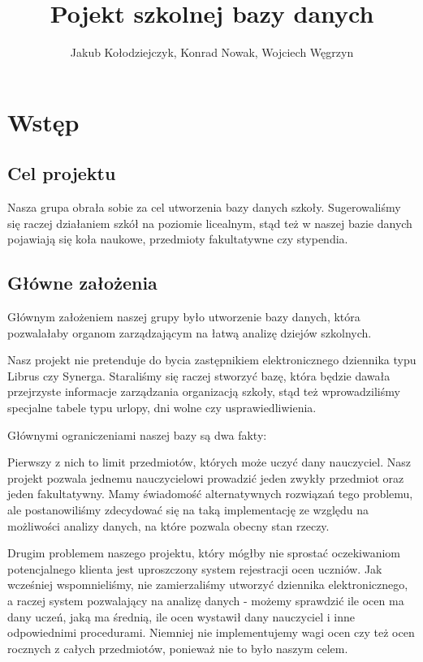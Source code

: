 \documentclass[60pt]{article}
\title{Pojekt szkolnej bazy danych}
\author{Jakub Kołodziejczyk, Konrad Nowak, Wojciech Węgrzyn}
\begin{document}
\maketitle

\newpage
\tableofcontents

\newpage
\section{Wstęp}

\subsection{Cel projektu}

Nasza grupa obrała sobie za cel utworzenia bazy danych szkoły. Sugerowaliśmy się raczej działaniem szkół na poziomie licealnym, stąd też w naszej bazie danych pojawiają się koła naukowe, przedmioty fakultatywne czy stypendia. 

\subsection{Główne założenia}

Głównym założeniem naszej grupy było utworzenie bazy danych, która pozwalałaby organom zarządzającym na łatwą analizę dziejów szkolnych. 

Nasz projekt nie pretenduje do bycia zastępnikiem elektronicznego dziennika typu Librus czy Synerga. Staraliśmy się raczej stworzyć bazę, która będzie dawała przejrzyste informacje zarządzania organizacją szkoły, stąd też wprowadziliśmy specjalne tabele typu urlopy, dni wolne czy usprawiedliwienia. 

Głównymi ograniczeniami naszej bazy są dwa fakty:

Pierwszy z nich to limit przedmiotów, których może uczyć dany nauczyciel. Nasz projekt pozwala jednemu nauczycielowi prowadzić jeden zwykły przedmiot oraz jeden fakultatywny. Mamy świadomość alternatywnych rozwiązań tego problemu, ale postanowiliśmy zdecydować się na taką implementację ze względu na możliwości analizy danych, na które pozwala obecny stan rzeczy. 

Drugim problemem naszego projektu, który mógłby nie sprostać oczekiwaniom potencjalnego klienta jest uproszczony system rejestracji ocen uczniów. Jak wcześniej wspomnieliśmy, nie zamierzaliśmy utworzyć dziennika elektronicznego, a raczej system pozwalający na analizę danych - możemy sprawdzić ile ocen ma dany uczeń, jaką ma średnią, ile ocen wystawił dany nauczyciel i inne odpowiednimi procedurami. Niemniej nie implementujemy wagi ocen czy też ocen rocznych z całych przedmiotów, ponieważ nie to było naszym celem.
\end{document}
